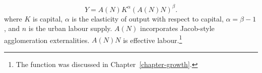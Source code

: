 \begin{equation}
Y=A(N)K^{\alpha }(A(N)N)^\beta.
\label{eqn-prod1}
\end{equation}
where $K$ is capital, $\alpha$ is the elasticity of output with respect to capital, $\alpha = \beta - 1$, and  $n$ is the \gls{urban labour supply}. $A(N)$ incorporates Jacob-style agglomeration externalities. $A(N)N$ is \gls{effective labour}.\footnote{The function  was discussed in Chapter~\ref{chapter-growth}.}


 



